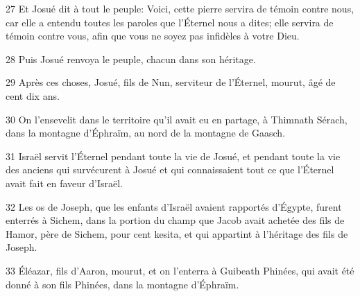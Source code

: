 \par 27 Et Josué dit à tout le peuple: Voici, cette pierre servira de témoin contre nous, car elle a entendu toutes les paroles que l'Éternel nous a dites; elle servira de témoin contre vous, afin que vous ne soyez pas infidèles à votre Dieu.
\par 28 Puis Josué renvoya le peuple, chacun dans son héritage.
\par 29 Après ces choses, Josué, fils de Nun, serviteur de l'Éternel, mourut, âgé de cent dix ans.
\par 30 On l'ensevelit dans le territoire qu'il avait eu en partage, à Thimnath Sérach, dans la montagne d'Éphraïm, au nord de la montagne de Gaasch.
\par 31 Israël servit l'Éternel pendant toute la vie de Josué, et pendant toute la vie des anciens qui survécurent à Josué et qui connaissaient tout ce que l'Éternel avait fait en faveur d'Israël.
\par 32 Les os de Joseph, que les enfants d'Israël avaient rapportés d'Égypte, furent enterrés à Sichem, dans la portion du champ que Jacob avait achetée des fils de Hamor, père de Sichem, pour cent kesita, et qui appartint à l'héritage des fils de Joseph.
\par 33 Éléazar, fils d'Aaron, mourut, et on l'enterra à Guibeath Phinées, qui avait été donné à son fils Phinées, dans la montagne d'Éphraïm.



